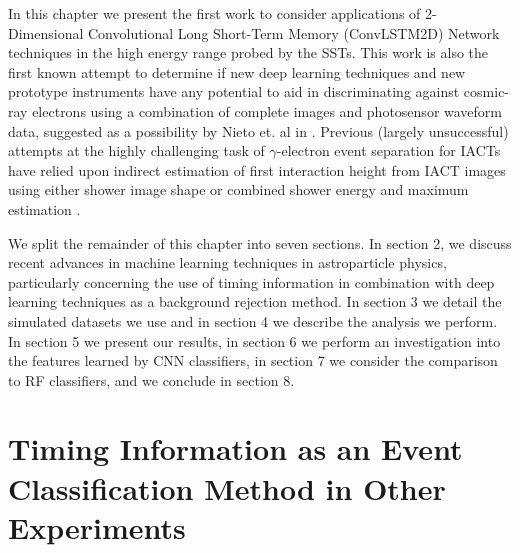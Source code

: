 In this chapter we present the first work to consider applications of 2-Dimensional Convolutional Long Short-Term Memory (ConvLSTM2D) Network techniques in the high energy range probed by the SSTs. This work is also the first known attempt to determine if new deep learning techniques and new prototype instruments have any potential to aid in discriminating against cosmic-ray electrons using a combination of complete images and photosensor waveform data, suggested as a possibility by Nieto et. al in \cite{nieto2017exploring}. Previous (largely unsuccessful) attempts at the highly challenging task of $\gamma$-electron event separation for IACTs have relied upon indirect estimation of first interaction height from IACT images using either shower image shape or combined shower energy and maximum estimation \cite{Sitarek1i}.

We split the remainder of this chapter into seven sections. In section 2, we discuss recent advances in machine learning techniques in astroparticle physics, particularly concerning the use of timing information in combination with deep learning techniques as a background rejection method. In section 3 we detail the simulated datasets we use and in section 4 we describe the analysis we perform. In section 5 we present our results, in section 6 we perform an investigation into the features learned by CNN classifiers, in section 7 we consider the comparison to RF classifiers, and we conclude in section 8. 

\section{Timing Information as an Event Classification Method in Other Experiments} \label{RelatedWork}
